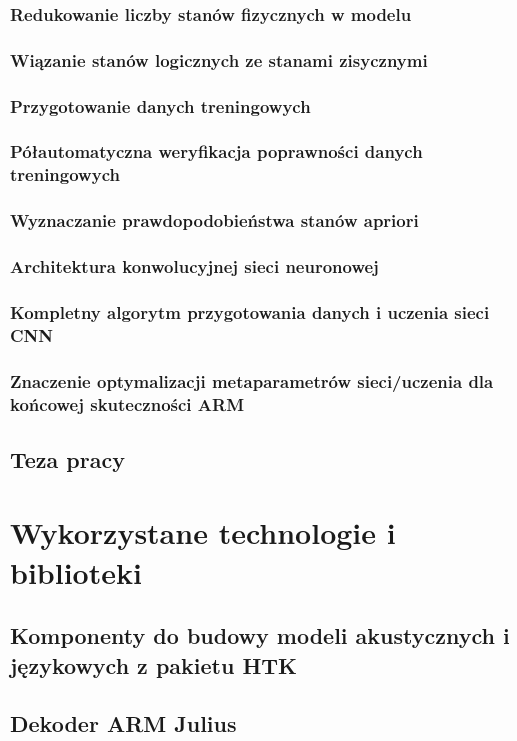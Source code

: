 \documentclass[11pt]{article}
\begin{document}
		\subsubsection{ Redukowanie liczby stanów fizycznych w modelu }
		\subsubsection{ Wiązanie stanów logicznych ze stanami zisycznymi }
		\subsubsection{ Przygotowanie danych treningowych }
		\subsubsection{ Półautomatyczna weryfikacja poprawności danych treningowych }
		\subsubsection{ Wyznaczanie prawdopodobieństwa stanów apriori }
		\subsubsection{ Architektura konwolucyjnej sieci neuronowej }
		\subsubsection{ Kompletny algorytm przygotowania danych i uczenia sieci CNN }
		\subsubsection{ Znaczenie optymalizacji metaparametrów sieci/uczenia dla końcowej skuteczności ARM }	
	\subsection{ Teza pracy }

\section{ Wykorzystane technologie i biblioteki }
	\subsection{ Komponenty do budowy modeli akustycznych i językowych z pakietu HTK }
	\subsection{ Dekoder ARM Julius }
\end{document}

